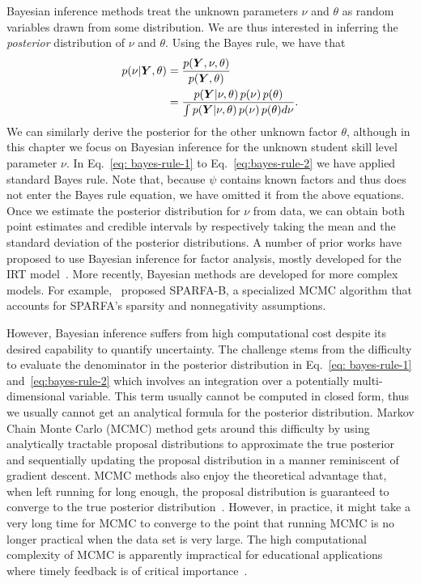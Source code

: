 Bayesian inference methods treat the unknown parameters $\nu$ and $\theta$ as
random variables drawn from some distribution. We are thus interested in
inferring the \textit{posterior} distribution of $\nu$ and $\theta$. Using the
Bayes rule, we have that
%
\begin{align}
    p(\nu | {\bm{Y}}, \theta) & = \frac{p({\bm{Y}}, \nu, \theta)}{p({\bm{Y}},\theta)} \label{eq: bayes-rule-1}                                                                         \\
                         & = \frac{p({\bm{Y}} | \nu, \theta)\,p(\nu)\,p(\theta)}{\int p({\bm{Y}} | \nu, \theta)\,p(\nu)\,p(\theta) d\nu}. \label{eq:bayes-rule-2}
\end{align}
We can similarly derive the posterior for the other unknown factor $\theta$, although in this chapter we focus on Bayesian inference for the unknown student skill level parameter $\nu$.
In Eq.~\ref{eq: bayes-rule-1} to Eq.~\ref{eq:bayes-rule-2} we have applied standard Bayes rule. Note that, because $\psi$ contains known factors and thus does not enter the Bayes rule equation, we have omitted it from the above equations. Once we estimate the posterior distribution for $\nu$ from data, we can obtain both point estimates and credible intervals by respectively taking the mean and the standard deviation of the posterior distributions. A number of prior works have proposed to use Bayesian inference for factor analysis, mostly developed for the IRT model~\cite{fox2001bayesian,mislevy1986bayes}. More recently, Bayesian methods are developed for more complex models. For example,~\cite{lan14a} proposed SPARFA-B, a specialized MCMC algorithm that accounts for SPARFA's sparsity and nonnegativity assumptions.

However, Bayesian inference suffers from high computational cost despite its
desired capability to quantify uncertainty. The challenge stems from the
difficulty to evaluate the denominator in the posterior distribution in
Eq.~\ref{eq: bayes-rule-1} and~\ref{eq:bayes-rule-2} which involves an
integration over a potentially multi-dimensional variable. This term usually
cannot be computed in closed form, thus we usually cannot get an analytical
formula for the posterior distribution. Markov Chain Monte Carlo (MCMC) method
gets around this difficulty by using analytically tractable proposal
distributions to approximate the true posterior and sequentially updating the
proposal distribution in a manner reminiscent of gradient descent. MCMC methods
also enjoy the theoretical advantage that, when left running for long enough,
the proposal distribution is guaranteed to converge to the true posterior
distribution~\cite{gelman2013bayesian}. However, in practice, it might take
a very long time for MCMC to converge to the point that running MCMC is no longer
practical when the data set is very large. The high computational complexity of
MCMC is apparently impractical for educational applications where timely
feedback is of critical importance~\cite{driscoll1994psychology}.
% 
